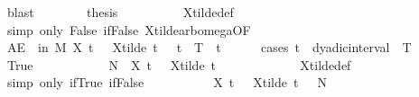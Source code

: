 \begin{isabellebody}
\ blast\isanewline
\ \ \ \ \ \ \isamarkupfalse%
\ {\isacharquery}{\kern0pt}thesis\isanewline
\ \ \ \ \ \ \ \ \isamarkupfalse%
\ X{\isacharunderscore}{\kern0pt}tilde{\isacharunderscore}{\kern0pt}def\ \isamarkupfalse%
\ {\isacharparenleft}{\kern0pt}simp\ only{\isacharcolon}{\kern0pt}\ False\ if{\isacharunderscore}{\kern0pt}False\ X{\isacharunderscore}{\kern0pt}tilde{\isacharunderscore}{\kern0pt}arb{\isacharunderscore}{\kern0pt}omega{\isacharbrackleft}{\kern0pt}OF\ {}{\isacharbrackright}{\kern0pt}{\isacharparenright}{\kern0pt}\isanewline
\ \ \ \ \isamarkupfalse%
\isanewline
\ \ \ \ \isamarkupfalse%
\ {\isachardoublequoteopen}AE\ {\isasymomega}\ in\ {\isacharquery}{\kern0pt}M{\isachardot}{\kern0pt}\ X\ t\ {\isasymomega}\ {\isacharequal}{\kern0pt}\ X{\isacharunderscore}{\kern0pt}tilde\ t\ {\isasymomega}{\isachardoublequoteclose}\ \ {\isachardoublequoteopen}t\ {\isasymin}\ {\isacharbraceleft}{\kern0pt}{}{\isachardot}{\kern0pt}{\isachardot}{\kern0pt}T{\isacharbraceright}{\kern0pt}{\isachardoublequoteclose}\ \ t\isanewline
\ \ \ \ \isamarkupfalse%
\ {\isacharparenleft}{\kern0pt}cases\ {\isachardoublequoteopen}t\ {\isasymin}\ dyadic{\isacharunderscore}{\kern0pt}interval\ {}\ T{\isachardoublequoteclose}{\isacharparenright}{\kern0pt}\isanewline
\ \ \ \ \ \ \isamarkupfalse%
\ True\isanewline
\ \ \ \ \ \ \isamarkupfalse%
\ \isamarkupfalse%
\ {\isachardoublequoteopen}{\isasymomega}\ {\isasymnotin}\ {\isacharquery}{\kern0pt}N\ {\isasymLongrightarrow}\ X\ t\ {\isasymomega}\ {\isacharequal}{\kern0pt}\ X{\isacharunderscore}{\kern0pt}tilde\ t\ {\isasymomega}{\isachardoublequoteclose}\ \ {\isasymomega}\isanewline
\ \ \ \ \ \ \ \ \isamarkupfalse%
\ X{\isacharunderscore}{\kern0pt}tilde{\isacharunderscore}{\kern0pt}def\ \isamarkupfalse%
\ {\isacharparenleft}{\kern0pt}simp\ only{\isacharcolon}{\kern0pt}\ if{\isacharunderscore}{\kern0pt}True\ if{\isacharunderscore}{\kern0pt}False{\isacharparenright}{\kern0pt}\isanewline
\ \ \ \ \ \ \isamarkupfalse%
\ \isamarkupfalse%
\ {\isachardoublequoteopen}{\isacharbraceleft}{\kern0pt}{\isasymomega}{\isachardot}{\kern0pt}\ X\ t\ {\isasymomega}\ {\isasymnoteq}\ X{\isacharunderscore}{\kern0pt}tilde\ t\ {\isasymomega}{\isacharbraceright}{\kern0pt}\ {\isasymsubseteq}\ {\isacharquery}{\kern0pt}N{\isachardoublequoteclose}\isanewline
\ \ \ \ \ \ \ \ \isamarkupfalse%

\end{isabellebody}
